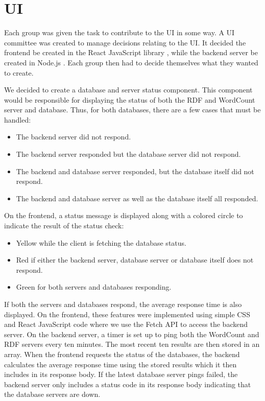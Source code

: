 \section{UI}
Each group was given the task to contribute to the \knox{} UI in some way. 
A UI committee was created to manage decisions relating to the UI. 
It decided the frontend be created in the React JavaScript library \cite{Reactjs}, while the backend server be created in Node.js \cite{Nodejs}.
Each group then had to decide themselves what they wanted to create. 


We decided to create a database and server status component. 
This component would be responsible for displaying the status of both the RDF and WordCount server and database. 
Thus, for both databases, there are a few cases that must be handled:
\begin{itemize}
	\item The backend server did not respond.
	\item The backend server responded but the database server did not respond.
	\item The backend and database server responded, but the database itself did not respond.
	\item The backend and database server as well as the database itself all responded.
\end{itemize}

On the frontend, a status message is displayed along with a colored circle to indicate the result of the status check:
\begin{itemize}
	\item Yellow while the client is fetching the database status.
	\item Red if either the backend server, database server or database itself does not respond.
	\item Green for both servers and databases responding.
\end{itemize}
If both the servers and databases respond, the average response time is also displayed.
On the frontend, these features were implemented using simple CSS and React JavaScript code where we use the Fetch API to access the backend server.
On the backend server, a timer is set up to ping both the WordCount and RDF servers every ten minutes.
The most recent ten results are then stored in an array.
When the frontend requests the status of the databases, the backend calculates the average response time using the stored results which it then includes in its response body.
If the latest database server pings failed, the backend server only includes a status code in its response body indicating that the database servers are down.


